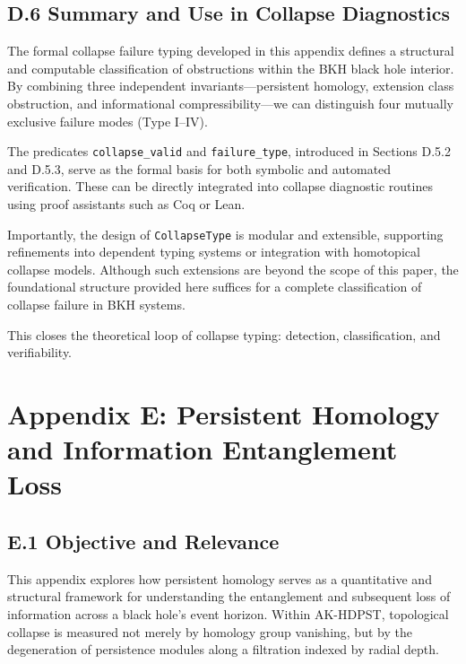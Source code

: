 \documentclass[11pt]{article}
\begin{document}
\subsection*{D.6 Summary and Use in Collapse Diagnostics}

The formal collapse failure typing developed in this appendix defines a structural and computable classification of obstructions within the BKH black hole interior. By combining three independent invariants—persistent homology, extension class obstruction, and informational compressibility—we can distinguish four mutually exclusive failure modes (Type I–IV).

The predicates \texttt{collapse\_valid} and \texttt{failure\_type}, introduced in Sections D.5.2 and D.5.3, serve as the formal basis for both symbolic and automated verification. These can be directly integrated into collapse diagnostic routines using proof assistants such as Coq or Lean.

Importantly, the design of \texttt{CollapseType} is modular and extensible, supporting refinements into dependent typing systems or integration with homotopical collapse models. Although such extensions are beyond the scope of this paper, the foundational structure provided here suffices for a complete classification of collapse failure in BKH systems.

This closes the theoretical loop of collapse typing: detection, classification, and verifiability.



\section*{Appendix E: Persistent Homology and Information Entanglement Loss}

\subsection*{E.1 Objective and Relevance}

This appendix explores how persistent homology serves as a quantitative and structural framework for understanding the entanglement and subsequent loss of information across a black hole’s event horizon. Within AK-HDPST, topological collapse is measured not merely by homology group vanishing, but by the degeneration of persistence modules along a filtration indexed by radial depth.
\end{document}
